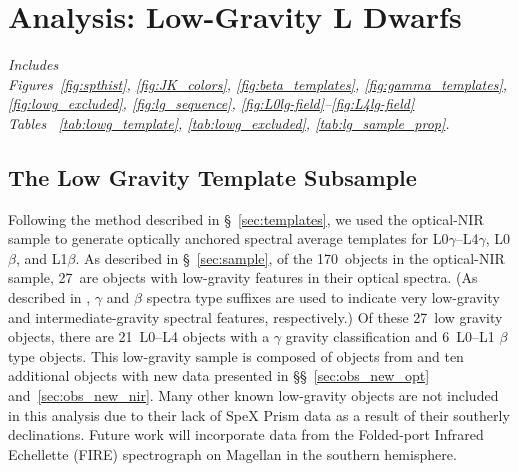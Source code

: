 \documentclass[12pt,preprint]{aastex}
\newcommand{\sample}{170}
\newcommand{\optLowG}{27}
\newcommand{\optBeta}{6}
\newcommand{\optGamma}{21}
\begin{document}


\clearpage
\section{Analysis: Low-Gravity L Dwarfs}
\label{sec:lowg}

\emph{Includes \\
Figures~\ref{fig:spthist}, \ref{fig:JK_colors}, \ref{fig:beta_templates}, \ref{fig:gamma_templates}, \ref{fig:lowg_excluded}, \ref{fig:lg_sequence}, \ref{fig:L0lg-field}--\ref{fig:L4lg-field}\\
Tables ~\ref{tab:lowg_template}, \ref{tab:lowg_excluded}, \ref{tab:lg_sample_prop}.}

\subsection{The Low Gravity Template Subsample}
\label{sec:templates_lowg}

Following the method described in \S~\ref{sec:templates}, we used the optical-NIR sample to generate optically anchored spectral average templates for L0$\gamma$--L4$\gamma$, L0$\beta$, and L1$\beta$.
As described in \S~\ref{sec:sample}, of the \sample~objects in the optical-NIR sample, \optLowG~are objects with low-gravity features in their optical spectra.
(As described in \cite{Cruz09_lowg}, $\gamma$ and $\beta$ spectra type suffixes are used to indicate very low-gravity and intermediate-gravity spectral features, respectively.)
Of these \optLowG~low gravity objects, there are \optGamma~L0--L4 objects with a $\gamma$ gravity classification and \optBeta~L0--L1 $\beta$ type objects.
This low-gravity sample is composed of objects from \citet{Cruz07,Kirkpatrick08,Cruz09_lowg} and ten additional objects with new data presented in \S\S~\ref{sec:obs_new_opt} and~\ref{sec:obs_new_nir}.
Many other known low-gravity objects are not included in this analysis due to their lack of SpeX Prism data as a result of their southerly declinations.
Future work will incorporate data from the Folded-port Infrared Echellette (FIRE) spectrograph on Magellan \citep{Simcoe:2013kh} in the southern hemisphere.
\end{document}
